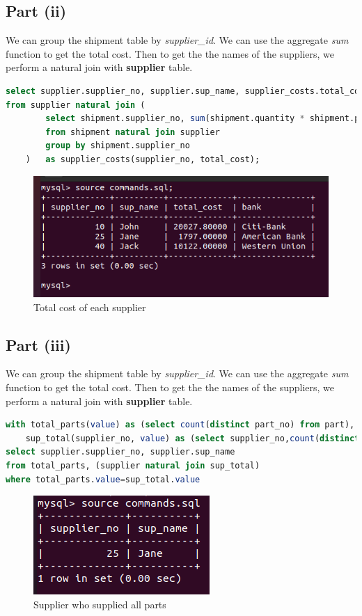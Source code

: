 \documentclass{article}
\begin{document}
\subsection{Part (ii)}
We can group the shipment table by \textit{supplier\_id}. We can use the
aggregate \textit{sum} function to get the total cost. Then to get the
the names of the suppliers, we perform a natural join with \textbf{supplier} table.
\begin{lstlisting}[language=sql]
select supplier.supplier_no, supplier.sup_name, supplier_costs.total_cost, supplier.bank
from supplier natural join (
        select shipment.supplier_no, sum(shipment.quantity * shipment.price)
        from shipment natural join supplier
        group by shipment.supplier_no
    ) 	as supplier_costs(supplier_no, total_cost);
\end{lstlisting}
\begin{figure}[!ht]
  \begin{center}
  \includegraphics[scale=0.57]{cost_per_supplier.png}
  \caption{Total cost of each supplier}
  \end{center}
\end{figure}

\subsection{Part (iii)}
We can group the shipment table by \textit{supplier\_id}. We can use the
aggregate \textit{sum} function to get the total cost. Then to get the
the names of the suppliers, we perform a natural join with \textbf{supplier} table.
\begin{lstlisting}[language=sql]
with total_parts(value) as (select count(distinct part_no) from part), 
    sup_total(supplier_no, value) as (select supplier_no,count(distinct part_no) from shipment group by supplier_no)
select supplier.supplier_no, supplier.sup_name
from total_parts, (supplier natural join sup_total)
where total_parts.value=sup_total.value
\end{lstlisting}
\begin{figure}[!ht]
  \begin{center}
  \includegraphics[scale=1]{5c.png}
  \caption{Supplier who supplied all parts}
  \end{center}
\end{figure}
\end{document}
